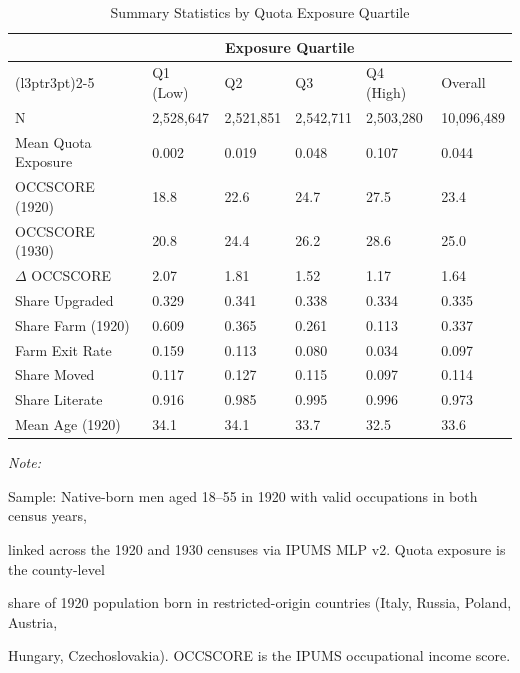 \begin{table}[!h]
\centering
\caption{\label{tab:summary}Summary Statistics by Quota Exposure Quartile}
\centering
\begin{threeparttable}
\begin{tabular}[t]{llllll}
\toprule
\multicolumn{1}{c}{ } & \multicolumn{4}{c}{Exposure Quartile} & \multicolumn{1}{c}{ } \\
\cmidrule(l{3pt}r{3pt}){2-5}
  & Q1 (Low) & Q2 & Q3 & Q4 (High) & Overall\\
\midrule
N & 2,528,647 & 2,521,851 & 2,542,711 & 2,503,280 & 10,096,489\\
Mean Quota Exposure & 0.002 & 0.019 & 0.048 & 0.107 & 0.044\\
OCCSCORE (1920) & 18.8 & 22.6 & 24.7 & 27.5 & 23.4\\
OCCSCORE (1930) & 20.8 & 24.4 & 26.2 & 28.6 & 25.0\\
$\Delta$ OCCSCORE & 2.07 & 1.81 & 1.52 & 1.17 & 1.64\\
\addlinespace
Share Upgraded & 0.329 & 0.341 & 0.338 & 0.334 & 0.335\\
Share Farm (1920) & 0.609 & 0.365 & 0.261 & 0.113 & 0.337\\
Farm Exit Rate & 0.159 & 0.113 & 0.080 & 0.034 & 0.097\\
Share Moved & 0.117 & 0.127 & 0.115 & 0.097 & 0.114\\
Share Literate & 0.916 & 0.985 & 0.995 & 0.996 & 0.973\\
\addlinespace
Mean Age (1920) & 34.1 & 34.1 & 33.7 & 32.5 & 33.6\\
\bottomrule
\end{tabular}
\begin{tablenotes}
\item \textit{Note: } 
\item Sample: Native-born men aged 18--55 in 1920 with valid occupations in both census years,
\item linked across the 1920 and 1930 censuses via IPUMS MLP v2. Quota exposure is the county-level
\item share of 1920 population born in restricted-origin countries (Italy, Russia, Poland, Austria,
\item Hungary, Czechoslovakia). OCCSCORE is the IPUMS occupational income score.
\end{tablenotes}
\end{threeparttable}
\end{table}
